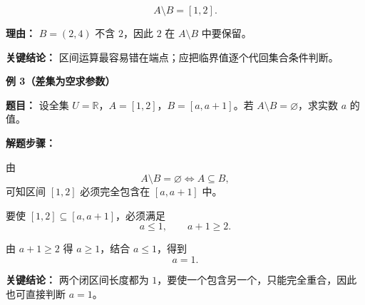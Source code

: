 \begin{examplebox}
\begin{description}[style=nextline, leftmargin=2.8em, labelsep=0.5em, itemsep=0.45em]
		\item[\textbf{第三步（差集）：}]
		      \[
			      A\setminus B=[1,2].
		      \]
		      \par\textbf{理由：}
		      \(B=(2,4)\) 不含 \(2\)，因此 \(2\) 在 \(A\setminus B\) 中要保留。
	\end{description}

	\textbf{\textcolor{CExample}{关键结论：}}
	区间运算最容易错在端点；应把临界值逐个代回集合条件判断。

	\medskip
	\textbf{\textcolor{CExample}{例 3（差集为空求参数）}}

	\textbf{\textcolor{CExample}{题目：}}
	设全集 \(U=\mathbb{R}\)，\(A=[1,2]\)，\(B=[a,a+1]\)。若 \(A\setminus B=\varnothing\)，求实数 \(a\) 的值。

	\textbf{\textcolor{CExample}{解题步骤：}}
	\begin{description}[style=nextline, leftmargin=2.8em, labelsep=0.5em, itemsep=0.45em]
		\item[\textbf{第一步（转化集合关系）：}]
		      由
		      \[
			      A\setminus B=\varnothing\iff A\subseteq B,
		      \]
		      可知区间 \([1,2]\) 必须完全包含在 \([a,a+1]\) 中。

		\item[\textbf{第二步（比较左右端点）：}]
		      要使 \([1,2]\subseteq[a,a+1]\)，必须满足
		      \[
			      a\leq 1,
			      \qquad
			      a+1\geq 2.
		      \]

		\item[\textbf{第三步（求参数）：}]
		      由 \(a+1\geq2\) 得 \(a\geq1\)，结合 \(a\leq1\)，得到
		      \[
			      a=1.
		      \]
	\end{description}

	\textbf{\textcolor{CExample}{关键结论：}}
	两个闭区间长度都为 \(1\)，要使一个包含另一个，只能完全重合，因此也可直接判断 \(a=1\)。
\end{examplebox}